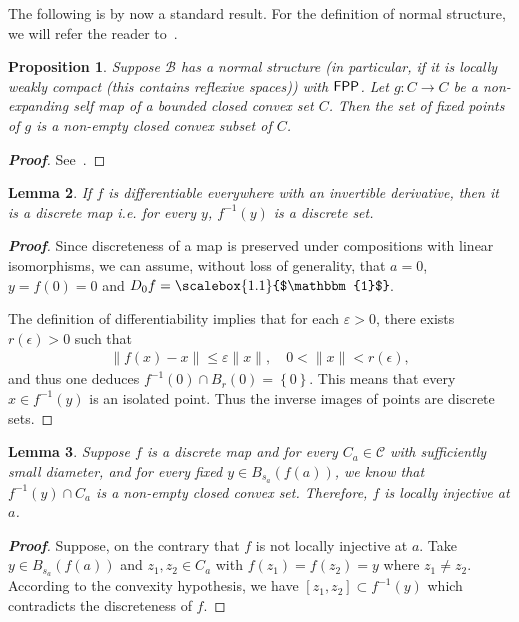\documentclass[a4, 12pt,leqno]{amsart}
\theoremstyle{plain}
\newtheorem{lemma}{Lemma}[section]
\newtheorem{proposition}[lemma]{Proposition}
\theoremstyle{definition}
\theoremstyle{remark}
\numberwithin{equation}{section}
\newcommand{\B}{\mathcal{B}}
\newcommand{\ident}{\raisebox{0pt}{\scalebox{1.1}{$\mathbbm{1}$}}\hspace{-1pt}}
\begin{document}
The following is by now a standard result. For the definition of normal structure, we will refer the reader to~\cite{BKS}. 
\begin{proposition}\label{prop:key-2}
	Suppose $\B$ has a normal structure (in particular, if it is locally weakly compact (this contains reflexive spaces)) with ${\sf FPP}$. Let $g: C \to C$ be a non-expanding self map of a bounded closed convex set $C$. Then the set of fixed points of $g$ is a non-empty closed convex subset of $C$.
\end{proposition}
\begin{proof}[\footnotesize \textbf{Proof}]
See~\cite{Bruck}.
\end{proof}
\begin{lemma}\label{lemma:2.5}
	If $f$ is differentiable everywhere with an invertible derivative, then it is a discrete map i.e. for every $y$, $f^{-1}(y)$ is a discrete set. 
\end{lemma}
\begin{proof}[\footnotesize \textbf{Proof}]
Since discreteness of a map is preserved under compositions with linear isomorphisms, we can assume, without loss of generality, that $a=0$, $y = f(0)=0$ and $D_0f = \ident$.  
\par The definition of differentiability implies that for each $\varepsilon>0$, there exists $r(\epsilon)>0$ such that
\begin{align}\label{eq:1}
	\|f(x) - x\|\le \varepsilon\|x\|, \quad 0<\|x\|< r(\epsilon),
\end{align}
and thus one deduces $f^{-1}(0)\cap B_r(0) = \left\{0\right\}$. This means that every $x \in f^{-1}(y)$ is an isolated point. Thus the inverse images of points are discrete sets.
\end{proof}
\begin{lemma}\label{lemma:key-3}
	Suppose $f$ is a discrete map and for every $C_a \in \mathscr{C}$ with sufficiently small diameter, and for every fixed $y \in B_{s_a}(f(a))$, we know that
	$
	f^{-1}(y) \cap C_a
	$
	is a non-empty closed convex set. Therefore, $f$ is locally injective at $a$. 
\end{lemma}
\begin{proof}[\footnotesize \textbf{Proof}]
\par Suppose, on the contrary that $f$ is not locally injective at $a$. Take $y\in B_{s_a}(f(a))$ and $z_1, z_2 \in C_a$ with	 $f(z_1)=f(z_2) = y$ where $z_1 \neq z_2$. According to the convexity hypothesis, we have $[z_1,z_2] \subset f^{-1}(y)$ which contradicts the discreteness of $f$. 
\end{proof}
\end{document}
